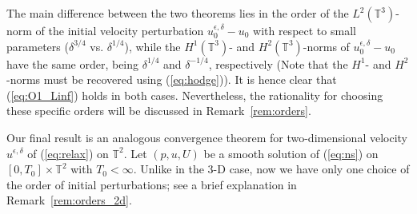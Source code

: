 \documentclass[reqno,10pt]{amsart}
\theoremstyle{definition}
\theoremstyle{remark}
\numberwithin{equation}{section}
\begin{document}
The main difference between the two theorems lies in the order of the $L^2(\mathbb T^3)$-norm of the initial velocity perturbation $u^{\epsilon,\delta}_0-u_0$ with respect to small parameters  ($\delta^{3/4}$ vs. $\delta^{1/4}$), while the $H^1(\mathbb T^3)$- and $H^2(\mathbb T^3)$-norms of $u^{\epsilon,\delta}_0-u_0$ have the same order, being $\delta^{1/4}$ and $\delta^{-1/4}$, respectively (Note that the $H^1$- and $H^2$-norms must be recovered using (\ref{eq:hodge})). It is hence clear that (\ref{eq:O1_Linf}) holds in both cases. Nevertheless, the rationality for choosing these specific orders will be discussed in Remark~\ref{rem:orders}.

Our final result is an analogous convergence theorem for two-dimensional velocity $u^{\epsilon,\delta}$ of (\ref{eq:relax}) on $\mathbb T^2$. Let $(p,u,U)$ be a smooth solution of (\ref{eq:ns}) on $[0,T_0]\times \mathbb T^2$ with $T_0<\infty$. Unlike in the 3-D case, now we have only one choice of the order of initial perturbations; see a brief explanation in Remark~\ref{rem:orders_2d}. 
\end{document}

